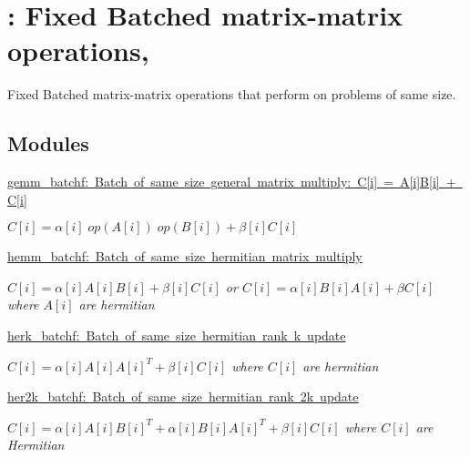 \hypertarget{group__core__batched__blas}{}\section{\+: Fixed Batched matrix-\/matrix operations,}
\label{group__core__batched__blas}


Fixed Batched matrix-\/matrix operations that perform on problems of same size.  


\subsection*{Modules}
\begin{DoxyCompactItemize}
\item 
\mbox{\hyperlink{group__gemm__batchf}{gemm\+\_\+batchf\+:  Batch of same size general  matrix multiply\+: C\mbox{[}i\mbox{]} = A\mbox{[}i\mbox{]}\+B\mbox{[}i\mbox{]} + C\mbox{[}i\mbox{]}}}
\begin{DoxyCompactList}\small\item\em $ C[i] = \alpha[i] \;op(A[i]) \;op(B[i]) + \beta[i] C[i] $ \end{DoxyCompactList}\item 
\mbox{\hyperlink{group__hemm__batchf}{hemm\+\_\+batchf\+: Batch of same size hermitian matrix multiply}}
\begin{DoxyCompactList}\small\item\em $ C[i] = \alpha[i] A[i] B[i] + \beta[i] C[i] $ or $ C[i] = \alpha[i] B[i] A[i] + \beta C[i] $ where $ A[i] $ are hermitian \end{DoxyCompactList}\item 
\mbox{\hyperlink{group__herk__batchf}{herk\+\_\+batchf\+:  Batch of same size hermitian rank k update}}
\begin{DoxyCompactList}\small\item\em $ C[i] = \alpha[i] A[i] A[i]^T + \beta[i] C[i] $ where $ C[i] $ are hermitian \end{DoxyCompactList}\item 
\mbox{\hyperlink{group__her2k__batchf}{her2k\+\_\+batchf\+: Batch of same size hermitian rank 2k update}}
\begin{DoxyCompactList}\small\item\em $ C[i] = \alpha[i] A[i] B[i]^T + \alpha[i] B[i] A[i]^T + \beta[i] C[i] $ where $ C[i] $ are Hermitian \end{DoxyCompactList}\item 

\end{DoxyCompactItemize}
